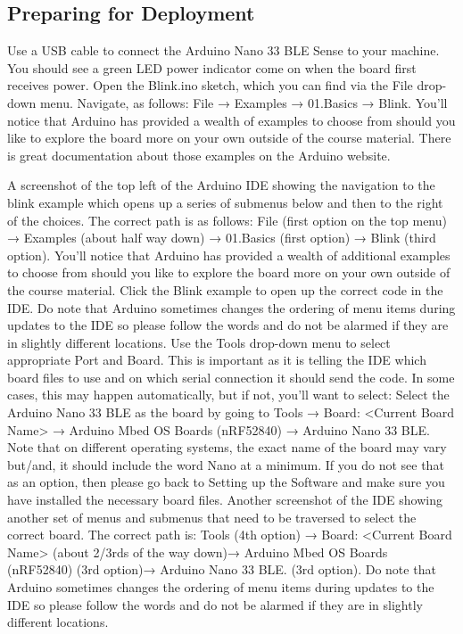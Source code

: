 \subsection{Preparing for Deployment}

Use a USB cable to connect the Arduino Nano 33 BLE Sense to your machine. You should see a green LED power indicator come on when the board first receives power.
Open the Blink.ino sketch, which you can find via the File drop-down menu. Navigate, as follows: File → Examples → 01.Basics → Blink. You’ll notice that Arduino has provided a wealth of examples to choose from should you like to explore the board more on your own outside of the course material. There is great documentation about those examples on the Arduino website.

A screenshot of the top left of the Arduino IDE showing the navigation to the blink example which opens up a series of submenus below and then to the right of the choices. The correct path is as follows: File (first option on the top menu) → Examples (about half way down) → 01.Basics (first option) → Blink (third option). You’ll notice that Arduino has provided a wealth of additional examples to choose from should you like to explore the board more on your own outside of the course material. Click the Blink example to open up the correct code in the IDE. Do note that Arduino sometimes changes the ordering of menu items during updates to the IDE so please follow the words and do not be alarmed if they are in slightly different locations.
Use the Tools drop-down menu to select appropriate Port and Board. This is important as it is telling the IDE which board files to use and on which serial connection it should send the code. In some cases, this may happen automatically, but if not, you’ll want to select:
Select the Arduino Nano 33 BLE as the board by going to Tools → Board: <Current Board Name> → Arduino Mbed OS Boards (nRF52840) → Arduino Nano 33 BLE. Note that on different operating systems, the exact name of the board may vary but/and, it should include the word Nano at a minimum. If you do not see that as an option, then please go back to Setting up the Software and make sure you have installed the necessary board files.
Another screenshot of the IDE showing another set of menus and submenus that need to be traversed to select the correct board. The correct path is: Tools (4th option) → Board: <Current Board Name> (about 2/3rds of the way down)→ Arduino Mbed OS Boards (nRF52840) (3rd option)→ Arduino Nano 33 BLE. (3rd option). Do note that Arduino sometimes changes the ordering of menu items during updates to the IDE so please follow the words and do not be alarmed if they are in slightly different locations.

